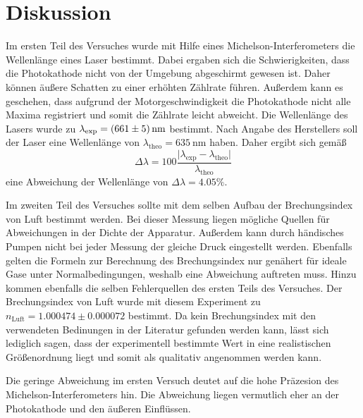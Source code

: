 \section{Diskussion}
\label{sec:Diskussion}
Im ersten Teil des Versuches wurde mit Hilfe eines Michelson-Interferometers die Wellenlänge eines Laser bestimmt. Dabei ergaben sich die Schwierigkeiten, dass die Photokathode 
nicht von der Umgebung abgeschirmt gewesen ist. Daher können äußere Schatten zu einer erhöhten Zählrate führen. Außerdem kann es geschehen, dass aufgrund der 
Motorgeschwindigkeit die Photokathode nicht alle Maxima registriert und somit die Zählrate leicht abweicht. 
Die Wellenlänge des Lasers wurde zu $\lambda_\text{exp} = \qty{661 +- 5}{\nano\metre}$ bestimmt. Nach Angabe des Herstellers soll der Laser eine Wellenlänge von
$\lambda_\text{theo} = \qty{635}{\nano\metre}$ haben.
Daher ergibt sich gemäß 
\begin{equation*}
    \Delta\lambda = 100\frac{\lvert \lambda_\text{exp} - \lambda_\text{theo}\rvert}{\lambda_\text{theo}}
\end{equation*}
eine Abweichung der Wellenlänge von $\Delta\lambda = 4.05\%$.

Im zweiten Teil des Versuches sollte mit dem selben Aufbau der Brechungsindex von Luft bestimmt werden. Bei dieser Messung liegen mögliche Quellen für Abweichungen in der Dichte
der Apparatur. Außerdem kann durch händisches Pumpen nicht bei jeder Messung der gleiche Druck eingestellt werden. Ebenfalls gelten die Formeln zur Berechnung des Brechungsindex
nur genähert für ideale Gase unter Normalbedingungen, weshalb eine Abweichung auftreten muss. Hinzu kommen ebenfalls die selben Fehlerquellen des ersten 
Teils des Versuches.
Der Brechungsindex von Luft wurde mit diesem Experiment zu $n_\text{Luft} = 1.000474 \pm 0.000072$ bestimmt. Da kein Brechungsindex mit den verwendeten Bedinungen in der 
Literatur gefunden werden kann, lässt sich lediglich sagen, dass der experimentell bestimmte Wert in eine realistischen Größenordnung liegt und somit als qualitativ
angenommen werden kann.

Die geringe Abweichung im ersten Versuch deutet auf die hohe Präzesion des Michelson-Interferometers hin. Die Abweichung liegen vermutlich eher an der Photokathode und den 
äußeren Einflüssen. 